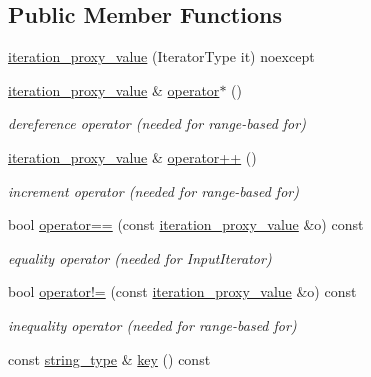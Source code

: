 \subsection*{Public Member Functions}
\begin{DoxyCompactItemize}
\item 
\hyperlink{classnlohmann_1_1detail_1_1iteration__proxy__value_a459dd8961b80b2089d8161c9aa466581}{iteration\+\_\+proxy\+\_\+value} (Iterator\+Type it) noexcept
\item 
\hyperlink{classnlohmann_1_1detail_1_1iteration__proxy__value}{iteration\+\_\+proxy\+\_\+value} \& \hyperlink{classnlohmann_1_1detail_1_1iteration__proxy__value_a10accadf05a172fdc69a016bec201e81}{operator$\ast$} ()
\begin{DoxyCompactList}\small\item\em dereference operator (needed for range-\/based for) \end{DoxyCompactList}\item 
\hyperlink{classnlohmann_1_1detail_1_1iteration__proxy__value}{iteration\+\_\+proxy\+\_\+value} \& \hyperlink{classnlohmann_1_1detail_1_1iteration__proxy__value_adf4db2aef31822f3a179435158a4de11}{operator++} ()
\begin{DoxyCompactList}\small\item\em increment operator (needed for range-\/based for) \end{DoxyCompactList}\item 
bool \hyperlink{classnlohmann_1_1detail_1_1iteration__proxy__value_a740056c5966f5a8d98bbcb925c3cf5d5}{operator==} (const \hyperlink{classnlohmann_1_1detail_1_1iteration__proxy__value}{iteration\+\_\+proxy\+\_\+value} \&o) const 
\begin{DoxyCompactList}\small\item\em equality operator (needed for Input\+Iterator) \end{DoxyCompactList}\item 
bool \hyperlink{classnlohmann_1_1detail_1_1iteration__proxy__value_a88f31e04723bdc7a5422f4ec5cb703e7}{operator!=} (const \hyperlink{classnlohmann_1_1detail_1_1iteration__proxy__value}{iteration\+\_\+proxy\+\_\+value} \&o) const 
\begin{DoxyCompactList}\small\item\em inequality operator (needed for range-\/based for) \end{DoxyCompactList}\item 
const \hyperlink{classnlohmann_1_1detail_1_1iteration__proxy__value_a1fc63b88a585fa39942007aab69a74e6}{string\+\_\+type} \& \hyperlink{classnlohmann_1_1detail_1_1iteration__proxy__value_ad8c7b5e34249ecc6624d3fb8d9200277}{key} () const 

\end{DoxyCompactItemize}
